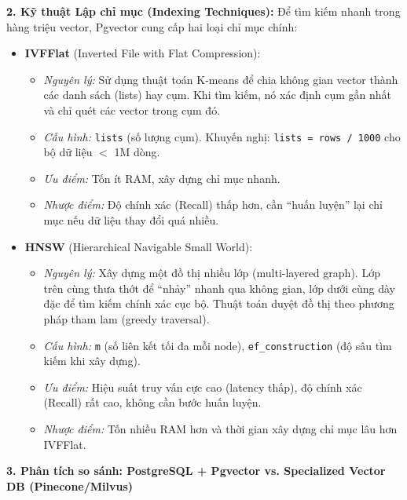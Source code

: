 \documentclass[12pt,a4paper]{report}
\begin{document}
\textbf{2. Kỹ thuật Lập chỉ mục (Indexing Techniques):} Để tìm kiếm nhanh trong hàng triệu vector, Pgvector cung cấp hai loại chỉ mục chính:
\begin{itemize}
    \item \textbf{IVFFlat} (Inverted File with Flat Compression):
    \begin{itemize}
        \item \textit{Nguyên lý:} Sử dụng thuật toán K-means để chia không gian vector thành các danh sách (lists) hay cụm. Khi tìm kiếm, nó xác định cụm gần nhất và chỉ quét các vector trong cụm đó.
        \item \textit{Cấu hình:} \texttt{lists} (số lượng cụm). Khuyến nghị: \texttt{lists = rows / 1000} cho bộ dữ liệu $<$ 1M dòng.
        \item \textit{Ưu điểm:} Tốn ít RAM, xây dựng chỉ mục nhanh.
        \item \textit{Nhược điểm:} Độ chính xác (Recall) thấp hơn, cần ``huấn luyện'' lại chỉ mục nếu dữ liệu thay đổi quá nhiều.
    \end{itemize}
    \item \textbf{HNSW} (Hierarchical Navigable Small World):
    \begin{itemize}
        \item \textit{Nguyên lý:} Xây dựng một đồ thị nhiều lớp (multi-layered graph). Lớp trên cùng thưa thớt để ``nhảy'' nhanh qua không gian, lớp dưới cùng dày đặc để tìm kiếm chính xác cục bộ. Thuật toán duyệt đồ thị theo phương pháp tham lam (greedy traversal).
        \item \textit{Cấu hình:} \texttt{m} (số liên kết tối đa mỗi node), \texttt{ef\_construction} (độ sâu tìm kiếm khi xây dựng).
        \item \textit{Ưu điểm:} Hiệu suất truy vấn cực cao (latency thấp), độ chính xác (Recall) rất cao, không cần bước huấn luyện.
        \item \textit{Nhược điểm:} Tốn nhiều RAM hơn và thời gian xây dựng chỉ mục lâu hơn IVFFlat.
    \end{itemize}
\end{itemize}

\textbf{3. Phân tích so sánh: PostgreSQL + Pgvector vs. Specialized Vector DB (Pinecone/Milvus)}
\end{document}
